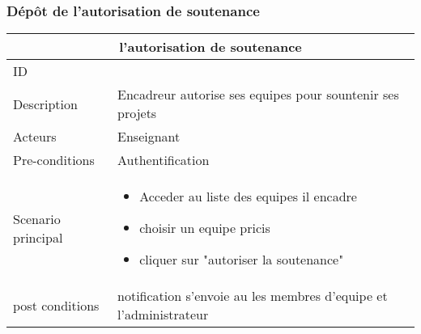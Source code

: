 \documentclass[11pt,fleqn]{book} %
\begin{document}
\subsubsection{Dépôt de l’autorisation de soutenance}
\begin{center}
\begin{tabularx}{1\textwidth} { | p{4cm} | >{\raggedright\arraybackslash}X |  }
  \hline
  \multicolumn{2}{|c|}{l’autorisation de soutenance} \\
 \hline
 ID & 2  \\
 \hline
 Description  & Encadreur autorise ses equipes pour sountenir ses projets   \\
  \hline
 Acteurs  & Enseignant   \\
  \hline
 Pre-conditions  & Authentification\\
 \hline
 Scenario principal  &  
 \begin{itemize}
     \item  Acceder au liste des equipes il encadre
     \item choisir un equipe pricis
     \item cliquer sur "autoriser la soutenance"

 \end{itemize}\\
  \hline
 post conditions  & notification s'envoie au les membres d'equipe et l'administrateur \\
  \hline
\end{tabularx}
\label{tbl:nicetablelesstable}
\end{center}
\end{document}
